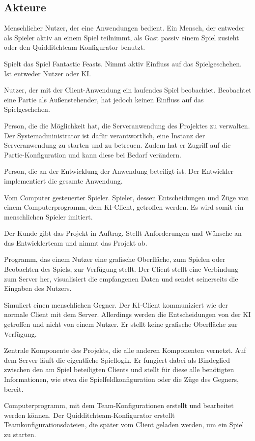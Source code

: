 \subsection{Akteure}

        {Menschlicher Nutzer, der eine Anwendungen bedient.}
        {Ein Mensch, der entweder als Spieler aktiv an einem Spiel teilnimmt, als Gast passiv einem Spiel zusieht oder den Quidditchteam-Konfigurator benutzt.}
        
        {Spielt das Spiel \glqq{}Fantastic Feasts\grqq{}.}
        {Nimmt aktiv Einfluss auf das Spielgeschehen. Ist entweder Nutzer oder KI.}
        
        {Nutzer, der mit der Client-Anwendung ein laufendes Spiel beobachtet.}
        {Beobachtet eine Partie als Außenstehender, hat jedoch keinen Einfluss auf das Spielgeschehen.}
    
        {Person, die die Möglichkeit hat, die Serveranwendung des Projektes zu verwalten.}
        {Der Systemadministrator ist dafür verantwortlich, eine Instanz der Serveranwendung zu starten und zu betreuen. Zudem hat er Zugriff auf die Partie-Konfiguration und kann diese bei Bedarf verändern.}

        {Person, die an der Entwicklung der Anwendung beteiligt ist.}
        {Der Entwickler implementiert die gesamte Anwendung.}	

        {Vom Computer gesteuerter Spieler.}
        {Spieler, dessen Entscheidungen und Züge von einem Computerprogramm, dem KI-Client, getroffen werden. Es wird somit ein menschlichen Spieler imitiert.}

        {Der Kunde gibt das Projekt in Auftrag.}
        {Stellt Anforderungen und Wünsche an das Entwicklerteam und nimmt das Projekt ab.}

        {Programm, das einem Nutzer eine grafische Oberfläche, zum Spielen oder Beobachten des Spiels, zur Verfügung stellt.}
        {Der Client stellt eine Verbindung zum Server her, visualisiert die empfangenen Daten und sendet seinerseits die Eingaben des Nutzers.}

        {Simuliert einen menschlichen Gegner.}
        {Der KI-Client kommuniziert wie der normale Client mit dem Server. Allerdings werden die Entscheidungen von der KI getroffen und nicht von einem Nutzer. Er stellt keine grafische Oberfläche zur Verfügung.}

        {Zentrale Komponente des Projekts, die alle anderen Komponenten vernetzt.}
        {Auf dem Server läuft die eigentliche Spiellogik. Er fungiert dabei als Bindeglied zwischen den am Spiel beteiligten Clients und stellt für diese alle benötigten Informationen, wie etwa die Spielfeldkonfiguration oder die Züge des Gegners, bereit.}
        
        {Computerprogramm, mit dem Team-Konfigurationen erstellt und bearbeitet werden können.}
        {Der Quidditchteam-Konfigurator erstellt Teamkonfigurationsdateien, die später vom Client geladen werden, um ein Spiel zu starten.}
